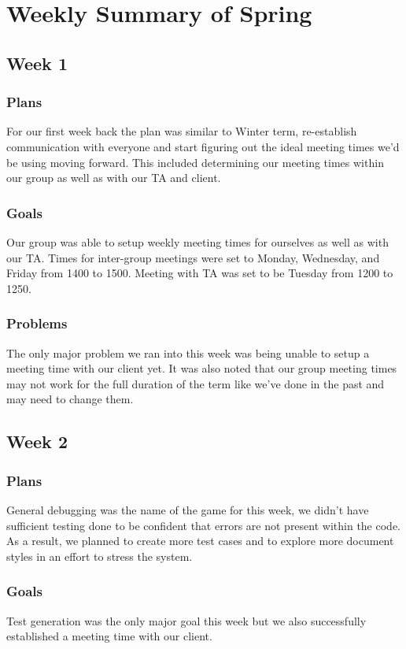 \documentclass[onecolumn, draftclsnofoot,10pt, compsoc]{IEEEtran}
\begin{document}
\section{Weekly Summary of Spring}
\subsection{Week 1}
\subsubsection{Plans}
For our first week back the plan was similar to Winter term, re-establish communication with everyone and start figuring out the ideal meeting times we'd be using moving forward. This included determining our meeting times within our group as well as with our TA and client.

\subsubsection{Goals}
Our group was able to setup weekly meeting times for ourselves as well as with our TA. Times for inter-group meetings were set to Monday, Wednesday, and Friday from 1400 to 1500. Meeting with TA was set to be Tuesday from 1200 to 1250.  

\subsubsection{Problems}
The only major problem we ran into this week was being unable to setup a meeting time with our client yet. It was also noted that our group meeting times may not work for the full duration of the term like we've done in the past and may need to change them.

\subsection{Week 2}
\subsubsection{Plans}
General debugging was the name of the game for this week, we didn't have sufficient testing done to be confident that errors are not present within the code. As a result, we planned to create more test cases and to explore more document styles in an effort to stress the system.

\subsubsection{Goals}
Test generation was the only major goal this week but we also successfully established a meeting time with our client.  
\end{document}
